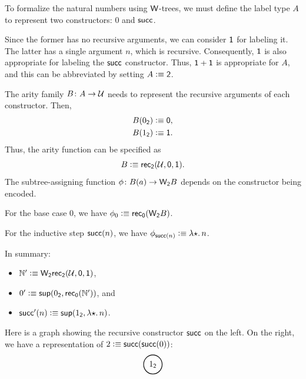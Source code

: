 \begin{xmpl}\label{xmpl:W-tree-for-N}
    To formalize the natural numbers using $\mathsf{W}$-trees, we must define the label type $A$ to represent two constructors: $0$ and $\mathsf{succ}$.
    
    Since the former has no recursive arguments, we can consider $\mathsf{1}$ for labeling it. The latter has a single argument $n$, which is recursive. Consequently, $\mathsf{1}$ is also appropriate for labeling the $\mathsf{succ}$ constructor. Thus, $\mathsf{1}+\mathsf{1}$ is appropriate for $A$, and this can be abbreviated by setting $A\mathrel{\vcentcolon}\equiv\mathsf{2}$.
    
    The arity family $B\colon A\to\univ$ needs to represent the recursive arguments of each constructor. Then,
    \begin{align*}
        B(0_{\mathsf{2}})&\mathrel{\vcentcolon}\equiv\mathsf{0},\\
        B(1_{\mathsf{2}})&\mathrel{\vcentcolon}\equiv\mathsf{1}.
    \end{align*}
    Thus, the arity function can be specified as
    \[
        B\mathrel{\vcentcolon}\equiv\mathsf{rec}_{\mathsf{2}}(\mathcal U,\mathsf{0},\mathsf{1}).
    \]
    The subtree-assigning function $\phi\colon B(a)\to\fun W_{\fun2}B$ depends on the constructor being encoded.
    
    For the base case $0$, we have $\phi_0\mathrel{\vcentcolon}\equiv\mathsf{rec}_{\mathsf{0}}(\mathsf{W}_{\mathsf{2}}B)$.
    
    For the inductive step $\mathsf{succ}(n)$, we have $\phi_{\mathsf{succ}(n)}\mathrel{\vcentcolon}\equiv\lambda{{\mathsf{\star}}}.\,n$.

    In summary:
    \begin{itemize}
        \item $\mathbb{N}'\mathrel{\vcentcolon}\equiv\mathsf{W}_{\mathsf{2}}\mathsf{rec}_{\mathsf{2}}(\mathcal U,\mathsf{0},\mathsf{1})$,
        \item $0'\mathrel{\vcentcolon}\equiv\mathsf{sup}(0_{\mathsf{2}},\mathsf{rec}_{\mathsf{0}}(\mathbb{N}'))$, and
        \item $\mathsf{succ}'(n)\mathrel{\vcentcolon}\equiv\mathsf{sup}(1_{\mathsf{2}},\lambda{{\mathsf{\star}}}.\,n)$.
    \end{itemize}
    Here is a graph showing the recursive constructor $\mathsf{succ}$ on the left. On the right, we have a representation of $2\mathrel{\vcentcolon}\equiv\mathsf{succ}(\mathsf{succ}(0))$:
    \[
        \begin{tikzpicture}[
            scale=0.75,
            >=stealth,
            thick,
            baseline=0]
            \node[circle, draw, minimum size=8mm] (x) at (0,0) {$1_{\fun2}$};
        
            \coordinate (t) at (0, -2);
        

\end{tikzpicture}\]
\end{xmpl}

